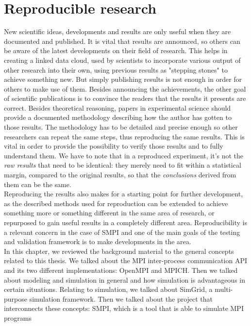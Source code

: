 \section{Reproducible research}
New scientific ideas, developments and results are only useful when
they are documented and published. It is vital that results are
announced, so others can be aware of the latest developments on their
field of research. This helps in creating a linked data cloud, used by
scientists to incorporate various output of other research into their
own, using previous results as "stepping stones" to achieve something
new.\cite{babbccrddg10} But simply publishing results is not enough in
order for others to make use of them. Besides announcing the
achievements, the other goal of scientific publications is to convince
the readers that the results it presents are correct. Besides
theoretical reasoning, papers in experimental science should provide a
documented methodology describing how the author has gotten to those
results.\cite{m10} The methodology has to be detailed and precise
enough so other researchers can repeat the same steps, thus
reproducing the same results. This is vital in order to provide the
possibility to verify those results and to fully understand
them. We have to note that in a reproduced experiment, it's not the
\emph{raw results} that need to be identical: they merely need to fit
within a statistical margin, compared to the original results, so that
the \emph{conclusions} derived from them can be the same.\\[0.3cm]
Reproducing the results also makes for a starting point for
further development, as the described methods used for reproduction
can be extended to achieve something more or something different in
the same area of research, or repurposed to gain useful results in a
completely different area. Reproducibility is a relevant concern in
the case of SMPI and one of the main goals of the testing and
validation framework is to make developments in the area.\\[0.5cm]
In this chapter, we reviewed the background material to the general
concepts related to this thesis. We talked about the MPI inter-process
communication API and its two different implementations: OpenMPI and
MPICH. Then we talked about modeling and simulation in general and how
simulation is advantageous in certain situations. Relating to
simulation, we talked about SimGrid, a multi-purpose simulation
framework. Then we talked about the project that interconnects these
concepts: SMPI, which is a tool that is able to simulate MPI programs
